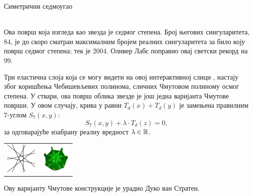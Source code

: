 ﻿\documentclass[en]{./../../common/SurferDesc}%
\begin{document}
\footnotesize




\begin{surferPage}
  \begin{surferTitle}Симетрични седмоугао\end{surferTitle}   \\
    Ова површ која изгледа као звезда је седмог степена. Број његових сингуларитета, $84$, 
	је до скоро сматран максималним бројем реалних сингуларитета за било коју површ седмог степена;
    тек је 2004. Оливер Лабс поправио овај светски рекорд на $99$.
  
  
 Три еластична слоја која се могу видети на овој интерактивној слици , 
    настају због коришћења Чебишевљевих полинома, сличних Чмутовом 
    полиному осмог степена. 
    У ствари, ова површ облика звезде је још једна варијанта Чмутове површи.
    У овом случају, крива у равни $T_d(x)+T_d(y)$ је замењена правилним $7$-углом
    $S_7(x,y)$: 
   \[S_7(x,y) + \lambda \cdot T_d(z) = 0,\]
    за одговарајуће изабрану реалну вредност $\lambda\in{\mathbb R}$. 
    \vspace*{-0.3em}
    \begin{center}
      \begin{tabular}{c@{\qquad}c}
        \includegraphics[height=1.5cm]{./../../common/images/labsseptic1.pdf}
        &
        \includegraphics[height=1.5cm]{./../../common/images/septic_7eck_von_oben}
      \end{tabular}
    \end{center}
    \vspace*{-0.3em}   
   Ову варијанту Чмутове конструкције је урадио Дуко ван Стратен. 


  \begin{surferText}
     \end{surferText}
\end{surferPage}
\end{document}
